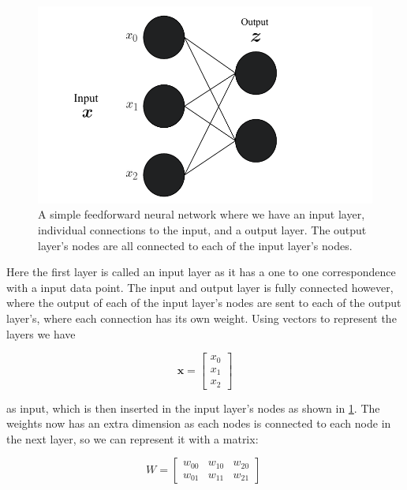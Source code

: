 \begin{figure}[H]
    \centering
    \includegraphics[width=\textwidth]{Figures/Drawn/machinelearning/inputoutputlayer.pdf}
    \caption{A simple feedforward neural network where we have an input layer, individual connections to the input, and a output layer. The output layer's nodes are all connected to each of the input layer's nodes.}
    \label{fig:inputoutput}
\end{figure}

Here the first layer is called an input layer as it has a one to one correspondence with a input data point. The input and output layer is fully connected however, where the output of each of the input layer's nodes are sent to each of the output layer's, where each connection has its own weight. Using vectors to represent the layers we have

\begin{equation}
    \boldsymbol{x} = \begin{bmatrix}
        x_0 \\ x_1 \\ x_2
    \end{bmatrix}
\end{equation}

as input, which is then inserted in the input layer's nodes as shown in \ref{fig:inputoutput}. The weights now has an extra dimension as each nodes is connected to each node in the next layer, so we can represent it with a matrix:

\begin{equation}
    W = \begin{bmatrix}
        w_{00} &  w_{10} & w_{20} \\
       w_{01} & w_{11} & w_{21}
      
    \end{bmatrix} \;
\end{equation}


